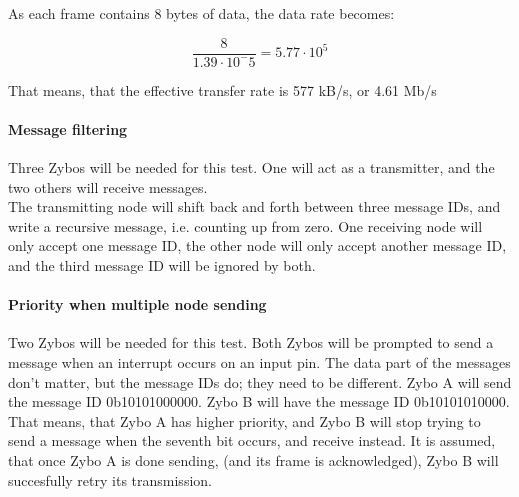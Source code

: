 As each frame contains 8 bytes of data, the data rate becomes:

\begin{equation}
\frac{8}{1.39 \cdot 10^-5}= 5.77 \cdot 10^5
\end{equation}

That means, that the effective transfer rate is 577 kB/s, or 4.61 Mb/s

\paragraph{Message filtering}
Three Zybos will be needed for this test.
One will act as a transmitter, and the two others will receive messages.\\
The transmitting node will shift back and forth between three message IDs, and write a recursive message, i.e. counting up from zero.
One receiving node will only accept one message ID, the other node will only accept another message ID, and the third message ID will be ignored by both.


\paragraph{Priority when multiple node sending}
Two Zybos will be needed for this test.
Both Zybos will be prompted to send a message when an interrupt occurs on an input pin. 
The data part of the messages don't matter, but the message IDs do; they need to be different.
Zybo A will send the message ID 0b10101000000.
Zybo B will have the message ID 0b10101010000.
That means, that Zybo A has higher priority, and Zybo B will stop trying to send a message when the seventh bit occurs, and receive instead.
It is assumed, that once Zybo A is done sending, (and its frame is acknowledged), Zybo B will succesfully retry its transmission. 